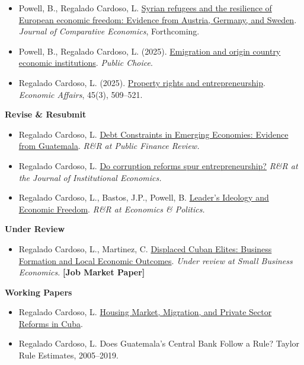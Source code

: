 \documentclass[11pt]{article}
\begin{document}
\begin{itemize}
    \item Powell, B., Regalado Cardoso, L. \href{https://leoregalado.com/publications/Powell_Regalado_Syrian_Refugees_European_Economic_Freedom_2026.pdf}{Syrian refugees and the resilience of European economic freedom: Evidence from Austria, Germany, and Sweden}. \textit{Journal of Comparative Economics}, Forthcoming.
    \item Powell, B., Regalado Cardoso, L. (2025). \href{https://doi.org/10.1007/s11127-025-01336-8}{Emigration and origin country economic institutions}. \textit{Public Choice}.
    \item Regalado Cardoso, L. (2025). \href{https://doi.org/10.1111/ecaf.70007}{Property rights and entrepreneurship}. \textit{Economic Affairs}, 45(3), 509--521.
\end{itemize}

\textbf{Revise \& Resubmit}

\begin{itemize}
    \item Regalado Cardoso, L. \href{https://leoregalado.com/publications/Regalado_Cardoso_Debt_Constraints_Guatemala_2026.pdf}{Debt Constraints in Emerging Economies: Evidence from Guatemala}. \textit{R\&R at Public Finance Review.}
    \item Regalado Cardoso, L. \href{https://leoregalado.com/publications/Regalado_Cardoso_Corruption_Reforms_Entrepreneurship_2026.pdf}{Do corruption reforms spur entrepreneurship?} \textit{R\&R at the Journal of Institutional Economics.}
    \item Regalado Cardoso, L., Bastos, J.P., Powell, B. \href{https://papers.ssrn.com/sol3/papers.cfm?abstract_id=7651122}{Leader's Ideology and Economic Freedom}. \textit{R\&R at Economics \& Politics.}
\end{itemize}

\textbf{Under Review}

\begin{itemize}
    \item Regalado Cardoso, L., Martinez, C. \href{https://papers.ssrn.com/sol3/papers.cfm?abstract_id=7657398}{Displaced Cuban Elites: Business Formation and Local Economic Outcomes}. \textit{Under review at Small Business Economics.} \textbf{[Job Market Paper]}
\end{itemize}

\textbf{Working Papers}

\begin{itemize}
    \item Regalado Cardoso, L. \href{https://leoregalado.com/publications/Regalado_Cardoso_Housing_Market_Migration_Cuba_2026.pdf}{Housing Market, Migration, and Private Sector Reforms in Cuba}.
    \item Regalado Cardoso, L. Does Guatemala's Central Bank Follow a Rule? Taylor Rule Estimates, 2005--2019.
\end{itemize}
\end{document}
